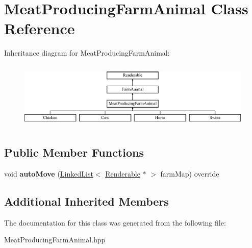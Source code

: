 \hypertarget{class_meat_producing_farm_animal}{}\section{Meat\+Producing\+Farm\+Animal Class Reference}
\label{class_meat_producing_farm_animal}
Inheritance diagram for Meat\+Producing\+Farm\+Animal\+:\begin{figure}[H]
\begin{center}
\leavevmode
\includegraphics[height=3.236994cm]{class_meat_producing_farm_animal}
\end{center}
\end{figure}
\subsection*{Public Member Functions}
\begin{DoxyCompactItemize}
\item 
\mbox{\label{class_meat_producing_farm_animal_a6a04729cb0e63e661e6554ae66d866b9}} 
void {\bfseries auto\+Move} (\mbox{\hyperlink{class_linked_list}{Linked\+List}}$<$ \mbox{\hyperlink{class_renderable}{Renderable}} $\ast$ $>$ farm\+Map) override
\end{DoxyCompactItemize}
\subsection*{Additional Inherited Members}


The documentation for this class was generated from the following file\+:\begin{DoxyCompactItemize}
\item 
Meat\+Producing\+Farm\+Animal.\+hpp\end{DoxyCompactItemize}
